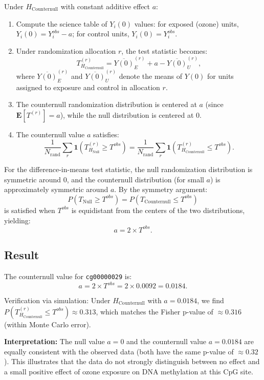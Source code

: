 \documentclass[11pt]{article}
\begin{document}
Under $H_{\text{Counternull}}$ with constant additive effect $a$:
\begin{enumerate}
  \item Compute the science table of $Y_i(0)$ values: for exposed (ozone) units, $Y_i(0) = Y_i^{obs} - a$; for control units, $Y_i(0) = Y_i^{obs}$.
  \item Under randomization allocation $r$, the test statistic becomes:
  \[
    T^{(r)}_{H_{\text{Counternull}}} = \overline{Y(0)}_{E}^{(r)} + a - \overline{Y(0)}_{U}^{(r)},
  \]
  where $\overline{Y(0)}_{E}^{(r)}$ and $\overline{Y(0)}_{U}^{(r)}$ denote the means of $Y(0)$ for units assigned to exposure and control in allocation $r$.
  \item The counternull randomization distribution is centered at $a$ (since $\mathbf{E}[T^{(r)}] = a$), while the null distribution is centered at 0.
  \item The counternull value $a$ satisfies:
  \[
    \frac{1}{N_{\text{rand}}}\sum_{r}\mathbf{1}(T^{(r)}_{H_{\text{Null}}} \geq T^{obs}) = \frac{1}{N_{\text{rand}}}\sum_{r}\mathbf{1}(T^{(r)}_{H_{\text{Counternull}}} \leq T^{obs}).
  \]
\end{enumerate}

For the difference-in-means test statistic, the null randomization distribution is symmetric around 0, and the counternull distribution (for small $a$) is approximately symmetric around $a$. By the symmetry argument:
\[
  P(T_{\text{Null}} \geq T^{obs}) = P(T_{\text{Counternull}} \leq T^{obs})
\]
is satisfied when $T^{obs}$ is equidistant from the centers of the two distributions, yielding:
\[
  a = 2 \times T^{obs}.
\]

\subsection*{Result}

The counternull value for \texttt{cg00000029} is:
\[
  \boxed{a = 2 \times T^{obs} = 2 \times 0.0092 = 0.0184.}
\]

Verification via simulation: Under $H_{\text{Counternull}}$ with $a = 0.0184$, we find $P(T^{(r)}_{H_{\text{Counternull}}} \leq T^{obs}) \approx 0.313$, which matches the Fisher p-value of $\approx 0.316$ (within Monte Carlo error).

\textbf{Interpretation:} The null value $a=0$ and the counternull value $a=0.0184$ are equally consistent with the observed data (both have the same p-value of $\approx 0.32$). This illustrates that the data do not strongly distinguish between no effect and a small positive effect of ozone exposure on DNA methylation at this CpG site.
\end{document}
